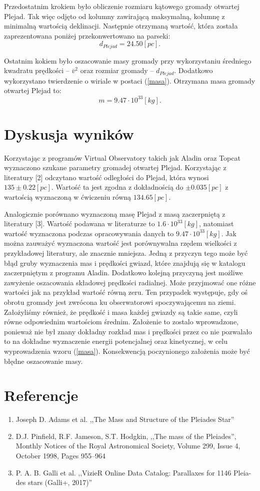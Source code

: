 \documentclass{aa}
\begin{document}
Przedostatnim krokiem było obliczenie rozmiaru kątowego gromady otwartej Plejad. Tak więc odjęto od kolumny zawirającą maksymalną, kolumnę z minimalną wartością deklinacji. Następnie otrzymaną wartość, która została zaprezentowana poniżej przekonwertowano na parseki: $$d_{Plejad} = 24.50 [pc].$$

Ostatnim kokiem było oszacowanie masy gromady przy wykorzystaniu średniego kwadratu prędkości -- $\overline{v} ^ 2$ oraz rozmiar gromady -- $d_{Plejad}$. Dodatkowo wykorzystano twierdzenie o wiriale w postaci (\ref{masa}). Otrzymana masa gromady otwartej Plejad to: $$m = 9.47 \cdot 10 ^ {33} [kg].$$
\section{Dyskusja wyników}
Korzystając z programów Virtual Observatory takich jak Aladin oraz Topcat wyznaczono szukane parametry gromadej otwartej Plejad. Korzystając z literatury [2] odczytano wartość odległości do Plejad, która wynosi $135 \pm 0.22 [pc].$ Wartość ta jest zgodna z dokładnością do $\pm 0.035 [pc]$ z wartością wyznaczoną w ćwiczeniu równą $134.65 [pc].$ 

Analogicznie porównano wyznaczoną masę Plejad z masą zaczerpniętą z literatury [3]. Wartość podawana w literaturze to $1.6 \cdot 10 ^ {33} [kg]$, natomiast wartość wyznaczona podczas opracowywania danych to $9.47 \cdot 10 ^ {33} [kg].$ Jak można zauważyć wyznaczona wartość jest porównywalna rzędem wielkości z przykładowej literatury, ale znacznie mniejsza. Jedną z przyczyn tego może być błąd gruby wyznaczenia mas i prędkości gwiazd, które znajdują się w katalogu zaczerpniętym z programu Aladin. Dodatkowo kolejną przyczyną jest możliwe zawyżenie oszacowania składowej prędkości radialnej. Może przyjmować one różne wartości jak na przykład wartość równą zeru. Ten przypadek występuje, gdy oś obrotu gromady jest zwrócona ku obserwatorowi spoczywającemu na ziemi. Założyliśmy również, że prędkość i masa każdej gwiazdy są takie same, czyli równe odpowiednim wartościom średnim. Założenie to zostalo wprowadzone, ponieważ nie był znany dokładny rozkład mas i prędkości przez co nie pozwalało to na dokładne wyznaczenie energii potencjalnej oraz kinetycznej, w celu wyprowadzenia wzoru (\ref{masa}). Konsekwencją poczynionego założenia może być błędne oszacowanie masy. 

\section{Referencje}
\begin{enumerate}
\item Joseph D. Adams et al. ,,The Mass and Structure of the Pleiades Star''
\item D.J. Pinfield, R.F. Jameson, S.T. Hodgkin, ,,The mass of the Pleiades'', Monthly Notices of the Royal Astronomical Society, Volume 299, Issue 4, October 1998, Pages 955–964
\item P. A. B. Galli et al. ,,VizieR Online Data Catalog: Parallaxes for 1146 Pleia-
des stars (Galli+, 2017)''
\end{enumerate}
\end{document}
